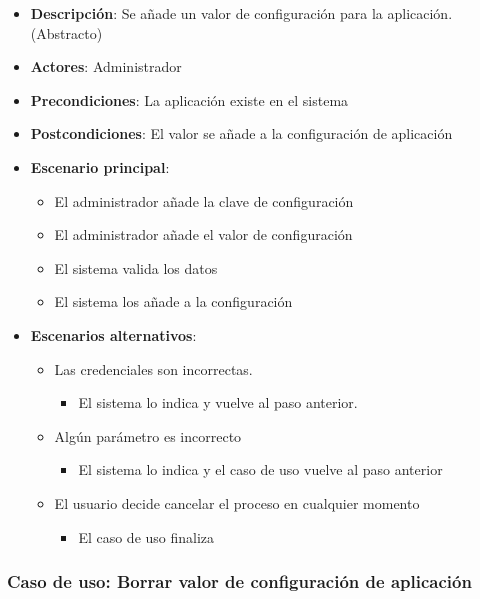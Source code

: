 \documentclass[12pt,a4paperpaper,]{report}
\providecommand{\tightlist}{%
  \setlength{\itemsep}{0pt}\setlength{\parskip}{0pt}}
\begin{document}
\begin{itemize}
\tightlist
\item
  \textbf{Descripción}: Se añade un valor de configuración para la
  aplicación. (Abstracto)
\item
  \textbf{Actores}: Administrador
\item
  \textbf{Precondiciones}: La aplicación existe en el sistema
\item
  \textbf{Postcondiciones}: El valor se añade a la configuración de
  aplicación
\item
  \textbf{Escenario principal}:

  \begin{itemize}
  \tightlist
  \item
    El administrador añade la clave de configuración
  \item
    El administrador añade el valor de configuración
  \item
    El sistema valida los datos
  \item
    El sistema los añade a la configuración
  \end{itemize}
\item
  \textbf{Escenarios alternativos}:

  \begin{itemize}
  \tightlist
  \item
    Las credenciales son incorrectas.

    \begin{itemize}
    \tightlist
    \item
      El sistema lo indica y vuelve al paso anterior.
    \end{itemize}
  \item
    Algún parámetro es incorrecto

    \begin{itemize}
    \tightlist
    \item
      El sistema lo indica y el caso de uso vuelve al paso anterior
    \end{itemize}
  \item
    El usuario decide cancelar el proceso en cualquier momento

    \begin{itemize}
    \tightlist
    \item
      El caso de uso finaliza
    \end{itemize}
  \end{itemize}
\end{itemize}

\subsubsection{Caso de uso: Borrar valor de configuración de
aplicación}\label{caso-de-uso-borrar-valor-de-configuraciuxf3n-de-aplicaciuxf3n}
\end{document}
